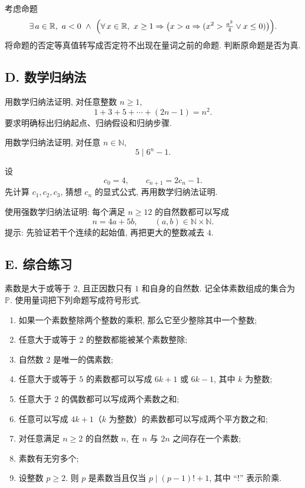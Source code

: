 \documentclass[usesamecnt, thmcnt=section, lang=cn, newtx, 10pt, scheme=chinese]{elegantbook}
\begin{document}
\begin{exercise}\label{ex:sets-17}
考虑命题
\[
 \exists\,a\in\mathbb R,\ a<0\ \wedge\
 \Bigl(\forall\,x\in\mathbb R,\ x\geq1\Rightarrow
 \bigl(x>a\Rightarrow(x^2>\tfrac{a^2}{4}\vee x\leq0)\bigr)\Bigr).
\]
将命题的否定等真值转写成否定符不出现在量词之前的命题. 判断原命题是否为真.
\end{exercise}

\subsection*{D. 数学归纳法}

\begin{exercise}\label{ex:sets-20}
用数学归纳法证明, 对任意整数 $n\geq1$,
\[
 1+3+5+\cdots+(2n-1)=n^2.
\]
要求明确标出归纳起点、归纳假设和归纳步骤.
\end{exercise}

\begin{exercise}\label{ex:sets-21}
用数学归纳法证明, 对任意 $n\in\mathbb N$,
\[
 5\mid 6^n-1.
\]
\end{exercise}

\begin{exercise}\label{ex:sets-22}
设
\[
 c_0=4,\qquad c_{n+1}=2c_n-1.
\]
先计算 $c_1,c_2,c_3$, 猜想 $c_n$ 的显式公式, 再用数学归纳法证明.
\end{exercise}

\begin{exercise}\label{ex:sets-23}
使用强数学归纳法证明: 每个满足 $n\geq12$ 的自然数都可以写成
\[
 n=4a+5b,
 \qquad (a,b)\in\mathbb N\times\mathbb N.
\]
提示: 先验证若干个连续的起始值, 再把更大的整数减去 $4$.
\end{exercise}

\subsection*{E. 综合练习}

\begin{exercise}\label{ex:sets-18}
素数是大于或等于 $2$, 且正因数只有 $1$ 和自身的自然数. 记全体素数组成的集合为 $\mathbb P$. 使用量词把下列命题写成符号形式.
\begin{enumerate}[label=\rm(\arabic*)]
  \item 如果一个素数整除两个整数的乘积, 那么它至少整除其中一个整数;
  \item 任意大于或等于 $2$ 的整数都能被某个素数整除;
  \item 自然数 $2$ 是唯一的偶素数;
  \item 任意大于或等于 $5$ 的素数都可以写成 $6k+1$ 或 $6k-1$, 其中 $k$ 为整数;
  \item 任意大于 $2$ 的偶数都可以写成两个素数之和;
  \item 任意可以写成 $4k+1$（$k$ 为整数）的素数都可以写成两个平方数之和;
  \item 对任意满足 $n\geq2$ 的自然数 $n$, 在 $n$ 与 $2n$ 之间存在一个素数;
  \item 素数有无穷多个;
  \item 设整数 $p\geq2$. 则 $p$ 是素数当且仅当 $p\mid(p-1)!+1$, 其中 ``$!$'' 表示阶乘.
\end{enumerate}
\end{exercise}
\end{document}
